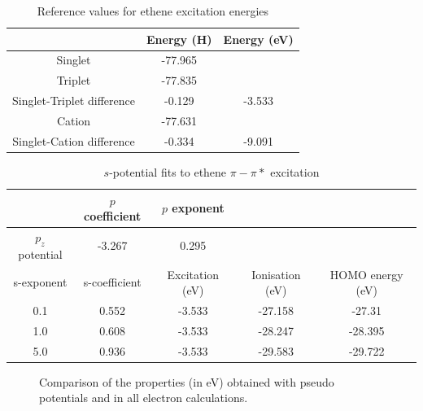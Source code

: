 \documentclass[journal=jctcce,manuscript=article]{achemso}
\begin{document}
\begin{table}[ht]
\caption{Reference values for ethene excitation energies}
\begin{tabular}{c c c }
\hline\hline
& Energy (H) & Energy (eV) \\
\hline
Singlet & -77.965 \\
Triplet & -77.835 \\
Singlet-Triplet difference & -0.129 & -3.533 \\
Cation & -77.631 \\
Singlet-Cation difference & -0.334 & -9.091 \\
\hline
\end{tabular}
\end{table}

\begin{table}[ht]
\caption{\(s\)-potential fits to ethene \(\pi-\pi*\) excitation}
\begin{tabular}{c c c c c}
\hline\hline
& \(p\) coefficient & \(p\) exponent \\
\hline
\(p_{z}\) potential & -3.267 & 0.295 \\
\hline
s-exponent & s-coefficient & Excitation (eV) & Ionisation (eV) & HOMO energy (eV) \\
\hline 
0.1 & 0.552 & -3.533 & -27.158 & -27.31 \\
1.0 & 0.608 & -3.533 & -28.247 & -28.395 \\
5.0 & 0.936 & -3.533 & -29.583 & -29.722 \\
\hline
\end{tabular}
\end{table}



\begin{figure}
\caption{\label{fig:properties}%
Comparison of the properties (in eV) obtained with pseudo potentials
and in all electron calculations.}
\end{figure}
\end{document}
